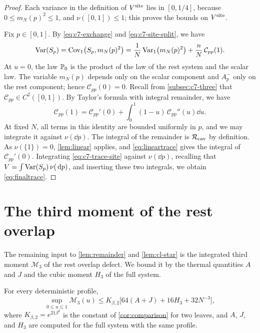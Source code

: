\begin{proof}
Each variance in the definition of $V^{\rm site}$ lies in $[0,1/4]$,
because $0\le m_N(p)^2\le1$, and $\nu([0,1])\le1$; this proves the bounds
on $V^{\rm site}$.

Fix $p\in[0,1]$. By \eqref{eq:c7-exchange} and \eqref{eq:c7-site-split},
we have
\begin{equation}\label{eq:c7-trace-site}
 \operatorname{Var}(S_p)=\operatorname{Cov}_1\bigl(S_p,m_N(p)^2\bigr)
 =\frac1N\operatorname{Var}_1\bigl(m_N(p)^2\bigr)+\frac nN\,\mathcal C_{pp}(1).
\end{equation}
At $u=0$, the law $\mathbb P_0$ is the product of the law of the rest system
and the scalar law. The variable $m_N(p)$ depends only on the scalar
component and $A^-_p$ only on the rest component; hence
$\mathcal C_{pp}(0)=0$. Recall from \cref{subsec:c7-three} that
$\mathcal C_{pp}\in C^2([0,1])$. By Taylor's formula with integral
remainder, we have
\[
 \mathcal C_{pp}(1)=\mathcal C_{pp}'(0)
 +\int_0^1(1-u)\,\mathcal C_{pp}''(u)\dd u .
\]
At fixed $N$, all terms in this identity are bounded uniformly in $p$,
and we may integrate it against $\nu(\dd p)$. The integral of the
remainder is $\mathcal R_{\rm cav}$ by definition. As $\nu(\{1\})=0$,
\cref{lem:linear} applies, and \eqref{eq:lineartrace} gives the integral
of $\mathcal C_{pp}'(0)$. Integrating \eqref{eq:c7-trace-site} against
$\nu(\dd p)$, recalling that $V=\int\operatorname{Var}(S_p)\,\nu(\,\mathrm d p)$, and inserting
these two integrals, we obtain \eqref{eq:finaltrace}.
\end{proof}

\section{The third moment of the rest overlap}\label{sec:c7-third-moment}

The remaining input to \cref{lem:remainder} and \cref{lem:cl-star} is
the integrated third moment $\mathcal M_3$ of the rest overlap defect.
We bound it by the thermal quantities $A$ and $J$ and the cubic moment
$H_3$ of the full system.

\begin{lemma}\label{lem:c7-thermal}
For every deterministic profile,
\[
 \sup_{0\le u\le1}\mathcal M_3(u)
 \le K_{\beta,2}\bigl[64(A+J)+16H_3+32N^{-3}\bigr],
\]
where $K_{\beta,2}=e^{21\beta^2}$ is the constant of
\cref{cor:comparison} for two leaves, and $A$, $J$, and $H_3$ are
computed for the full system with the same profile.
\end{lemma}

